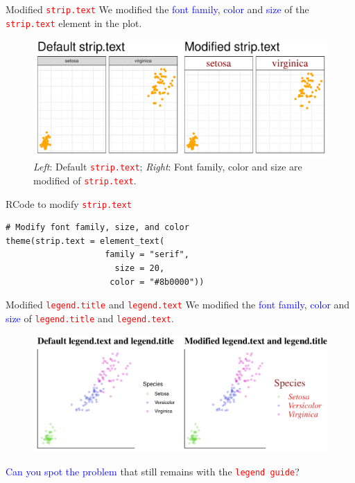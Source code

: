 \documentclass{beamer}
\begin{document}
\begin{frame}{Modified \textcolor{red}{\texttt{strip.text}}}
We modified the \textcolor{blue}{font family}, \textcolor{blue}{color} and \textcolor{blue}{size} of the \textcolor{red}{\texttt{strip.text}} element in the plot.
\begin{figure}
\includegraphics[width=0.99\linewidth]{PlotsLec3/StripText2}
\caption{{\small \textit{Left}: Default \textcolor{red}{\texttt{strip.text}}; \textit{Right}: Font family, color and size are modified of \textcolor{red}{\texttt{strip.text}}}.}
\end{figure}
\end{frame}

\begin{frame}[fragile]{RCode to modify \texttt{\textcolor{red}{strip.text}}}
\begin{lstlisting}
# Modify font family, size, and color
theme(strip.text = element_text(
                    family = "serif",
                      size = 20,
                     color = "#8b0000"))
\end{lstlisting}
\end{frame}

\begin{frame}{Modified \textcolor{red}{\texttt{legend.title}} and \textcolor{red}{\texttt{legend.text}}}
We modified the \textcolor{blue}{font family}, \textcolor{blue}{color} and \textcolor{blue}{size} of \textcolor{red}{\texttt{legend.title}} and  \textcolor{red}{\texttt{legend.text}}.
\begin{figure}
\includegraphics[width=0.99\linewidth]{PlotsLec3/LegText}
\end{figure}
\textcolor{blue}{Can you spot the problem} that still remains with the \textcolor{red}{\texttt{legend guide}}?
\end{frame}
\end{document}
